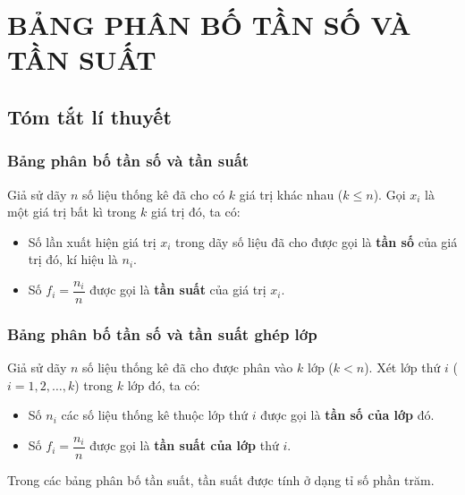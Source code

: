 \section{BẢNG PHÂN BỐ TẦN SỐ VÀ TẦN SUẤT}
\subsection{Tóm tắt lí thuyết}
\subsubsection{Bảng phân bố tần số và tần suất}
Giả sử dãy $n$ số liệu thống kê đã cho có $k$ giá trị khác nhau ($k \leq n$). Gọi $x_i$ là một giá trị bất kì trong $k$ giá trị đó, ta có:
\begin{itemize}
\item Số lần xuất hiện giá trị $x_i$ trong dãy số liệu đã cho được gọi là \textbf{tần số} của giá trị đó, kí hiệu là $n_i$.
\item Số $f_i = \dfrac{n_i}{n}$ được gọi là \textbf{tần suất} của giá trị $x_i$.
\end{itemize}
\subsubsection{Bảng phân bố tần số và tần suất ghép lớp}
Giả sử dãy $n$ số liệu thống kê đã cho được phân vào $k$ lớp ($k < n$). Xét lớp thứ $i$ ($i = 1, 2, \ldots, k$) trong $k$ lớp đó, ta có:
\begin{itemize}
\item Số $n_i$ các số liệu thống kê thuộc lớp thứ $i$ được gọi là \textbf{tần số của lớp} đó.
\item Số $f_i = \dfrac{n_i}{n}$ được gọi là \textbf{tần suất của lớp} thứ $i$.
\end{itemize}
\begin{note}
Trong các bảng phân bố tần suất, tần suất được tính ở dạng tỉ số phần trăm.
\end{note}
